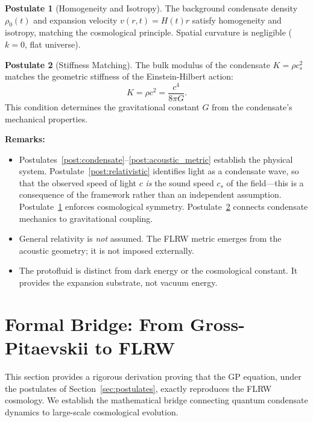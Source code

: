 \documentclass[11pt,a4paper]{article}
\theoremstyle{definition}
\newtheorem{postulate}{Postulate}
\theoremstyle{remark}
\begin{document}
\begin{postulate}[Homogeneity and Isotropy]
\label{post:homogeneity}
The background condensate density $\rho_0(t)$ and expansion velocity $v(r,t) = H(t)r$ satisfy homogeneity and isotropy, matching the cosmological principle. Spatial curvature is negligible ($k=0$, flat universe).
\end{postulate}

\begin{postulate}[Stiffness Matching]
\label{post:stiffness_matching}
The bulk modulus of the condensate $K = \rho c_s^2$ matches the geometric stiffness of the Einstein-Hilbert action:
\begin{equation}
K = \rho c^2 = \frac{c^4}{8\pi G}.
\end{equation}
This condition determines the gravitational constant $G$ from the condensate's mechanical properties.
\end{postulate}

\textbf{Remarks:}
\begin{itemize}[leftmargin=*, itemsep=0.2em]
\item Postulates~\ref{post:condensate}--\ref{post:acoustic_metric} establish the physical system. Postulate~\ref{post:relativistic} identifies light as a condensate wave, so that the observed speed of light $c$ \emph{is} the sound speed $c_s$ of the field---this is a consequence of the framework rather than an independent assumption. Postulate~\ref{post:homogeneity} enforces cosmological symmetry. Postulate~\ref{post:stiffness_matching} connects condensate mechanics to gravitational coupling.
\item General relativity is \emph{not} assumed. The FLRW metric emerges from the acoustic geometry; it is not imposed externally.
\item The protofluid is distinct from dark energy or the cosmological constant. It provides the expansion substrate, not vacuum energy.
\end{itemize}

\section{Formal Bridge: From Gross-Pitaevskii to FLRW}
\label{sec:formal_bridge}

This section provides a rigorous derivation proving that the GP equation, under the postulates of Section~\ref{sec:postulates}, exactly reproduces the FLRW cosmology. We establish the mathematical bridge connecting quantum condensate dynamics to large-scale cosmological evolution.
\end{document}
